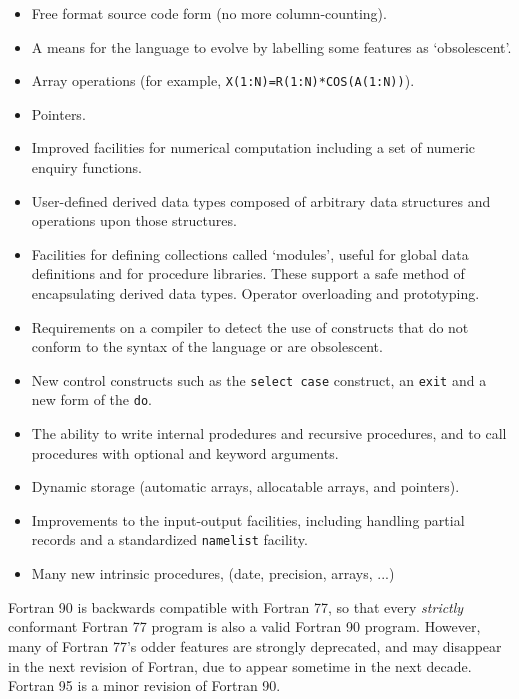 \documentclass[11pt,oneside,chapters]{starlink}
\begin{document}
\begin{itemize}
\item
Free format source code form (no more column-counting).

\item
A means for the language to evolve by labelling some features as
`obsolescent'.

\item
Array operations (for example,
\texttt{X(1:N)=R(1:N)*COS(A(1:N))}).

\item
Pointers.

\item
Improved facilities for numerical computation
including a set of numeric enquiry
functions.

\item
User-defined derived data types composed of arbitrary data
structures and operations upon those
structures.

\item
Facilities for defining collections called
`modules', useful for global data definitions and
for procedure libraries.  These support a safe
method of encapsulating derived data types.
Operator overloading and prototyping.

\item
Requirements on a compiler to detect the use of
constructs that do not conform to the syntax of the
language or are obsolescent.

\item
New control constructs such as the \texttt{select case} construct,
an \texttt{exit} and a
new form of the \texttt{do}.

\item
The ability to write internal prodedures and
recursive procedures, and to call procedures with
optional and keyword arguments.

\item
Dynamic storage (automatic arrays, allocatable
arrays, and pointers).

\item
Improvements to the input-output facilities,
including handling partial records and a
standardized \texttt{namelist}
facility.

\item
Many new intrinsic procedures, (date, precision,
arrays, ...)
\end{itemize}

Fortran 90 is backwards compatible with Fortran 77, so
that every \emph{strictly} conformant Fortran 77 program
is also a valid Fortran 90 program.  However, many of
Fortran 77's odder features are strongly deprecated, and
may disappear in the next revision of Fortran, due to
appear sometime in the next decade.  Fortran 95 is a minor
revision of Fortran 90.
\end{document}
